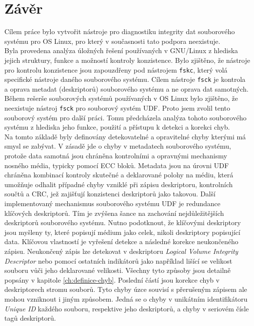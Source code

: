 \chapter{Závěr}
Cílem práce bylo vytvořit nástroje pro diagnostiku integrity dat souborového systému pro OS Linux, pro který v současnosti tato podpora neexistuje.\\
Byla provedena analýza úložných řešení používaných v GNU/Linux z hlediska jejich struktury, funkce a možností kontroly konzistence. Bylo zjištěno, že nástroje pro kontrolu konzistence jsou zapouzdřeny pod nástrojem \texttt{fskc}, který volá specifické nástroje daného souborového systému. Cílem nástroje \texttt{fsck} je kontrola a oprava metadat (deskriptorů) souborového systému a ne oprava dat samotných.\\
Během rešerše souborových systémů používaných v OS Linux bylo zjištěno, že neexistuje nástroj \texttt{fsck} pro souborový systém UDF. Proto jsem zvolil tento souborový systém pro další práci. Tomu předcházela analýza tohoto souborového systému z hlediska jeho funkce, použití a přístupu k detekci a korekci chyb.\\
Na tomto základě byly definovány detekovatelné a opravitelné chyby kterými má smysl se zabývat. V zásadě jde o chyby v metadatech souborového systému, protože data samotná jsou chráněna kontrolními a opravnými mechanismy nosného média, typicky pomocí ECC bloků. Metadata jsou na úrovni UDF chráněna kombinací kontroly skutečné a deklarované polohy na médiu, která umožňuje odhalit případné chyby vzniklé při zápisu deskriptoru, kontrolních součtů a CRC, jež zajišťují konzistenci deskriptorů jako takovou. Další implementovaný mechanismus souborového systému UDF je redundance klíčových deskriptorů. Tím je zvýšena šance na zachování nejdůležitějších deskriptorů souborového systému. Nutno podotknout, že klíčovými deskriptory jsou myšleny ty, které popisují médium jako celek, nikoli deskriptory popisující data. Klíčovou vlastností je vyřešení detekce a následné korekce neukončeného zápisu. Neukončený zápis lze detekovat v deskriptoru \textit{Logical Volume Integrity Descriptor} nebo pomocí ostatních indikátorů jako například lišící se velikost souboru vůči jeho deklarované velikosti. Všechny tyto způsoby jsou detailně popsány v kapitole \ref{ch:definice-chyb}. Poslední částí jsou korekce chyb v deskriptorech stromu souborů. Tyto chyby úzce souvisí s přerušeným zápisem ale mohou vzniknout i jiným způsobem. Jedná se o chyby v unikátním identifikátoru \textit{Unique ID} každého souboru, respektive jeho deskriptorů, a chyby v seriovém čísle tagů deskriptorů.\\
